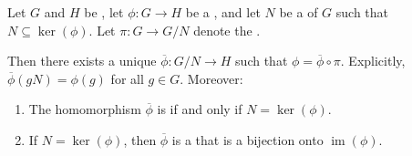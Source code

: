 \begin{lemma} \label{lemma:unique_factorization_of_group_homomorphism_through_quotient_by_normal_subgroup_contained_in_kernel}
    Let $G$ and $H$ be , let $\phi : G \to H$ be a , and let $N$ be a  of $G$ such that $N \subseteq \operatorname{ker}(\phi)$. Let $\pi : G \to G/\!N$ denote the .

    Then there exists a unique  $\overline{\phi} : G/\!N \to H$ such that $\phi = \overline{\phi} \circ \pi$. Explicitly, $\overline{\phi}(gN) = \phi(g)$ for all $g \in G$. Moreover:
    \begin{enumerate}
        \item\label{item:factorization_hom_injective_iff_N_equals_kernel} The homomorphism $\overline{\phi}$ is  if and only if $N = \operatorname{ker}(\phi)$.
        \item If $N = \operatorname{ker}(\phi)$, then $\overline{\phi}$ is a  that is a bijection onto $\operatorname{im}(\phi)$.
    \end{enumerate}
\end{lemma}

